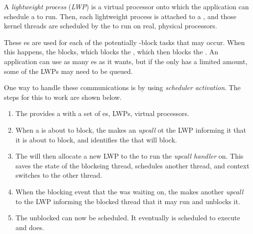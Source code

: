 \begin{definition}\label{def:Lightweight_Process}
  A \emph{lightweight process} (\emph{LWP}) is a virtual processor onto which the application can schedule a  to run.
  Then, each lightweight process is attached to a , and those kernel threads are scheduled by the  to run on real, physical processors.
\end{definition}

These es are used for each of the potentially -block tasks that may occur.
When this happens, the  blocks, which blocks the , which then blocks the .
An application can use as many es as it wants, but if the  only has a limited amount, some of the LWPs may need to be queued.

One way to handle these communications is by using \emph{scheduler activation}.
The steps for this to work are shown below.
\begin{enumerate}[noitemsep]
\item The  provides a  with a set of es, LWPs, virtual processors.
\item When a  is about to block, the  makes an \emph{upcall} ot the LWP informing it that it is about to block, and identifies the  that will block.
\item The  will then allocate a new LWP to the  to run the \emph{upcall handler} on.
  This saves the state of the blockeing thread, schedules another thread, and context switches to the other thread.
\item When the blocking event that the  was waiting on, the  makes another \emph{upcall} to the LWP informing the blocked thread that it may run and unblocks it.
\item The unblocked  can now be scheduled. It eventually is scheduled to execute and does.
\end{enumerate}

